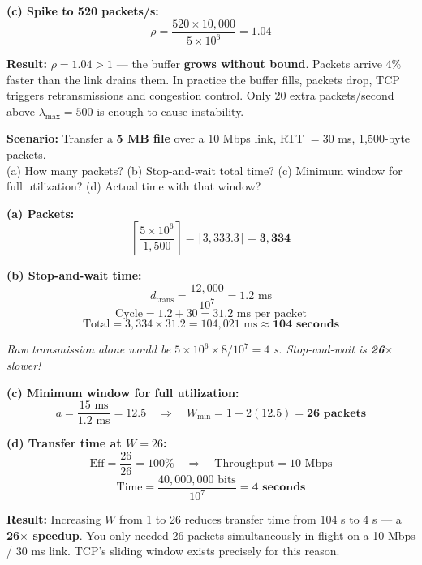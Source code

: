 \documentclass[11pt, letterpaper]{article}
\begin{document}
\textbf{(c) Spike to 520 packets/s:}
\[\rho = \frac{520 \times 10{,}000}{5 \times 10^6} = 1.04\]

\begin{tcolorbox}[colback=part4bg, colframe=sectionorange, arc=3pt, boxrule=1pt]
\textbf{Result:} $\rho = 1.04 > 1$ --- the buffer \textbf{grows without bound}. Packets
arrive 4\% faster than the link drains them. In practice the buffer fills, packets drop,
TCP triggers retransmissions and congestion control. Only 20 extra packets/second above
$\lambda_{\max} = 500$ is enough to cause instability.
\end{tcolorbox}

\vspace{8pt}

\begin{tcolorbox}[colback=part4bg, colframe=sectionorange,
  title={\bfseries Problem A6 --- File Transfer: Stop-and-Wait vs.\ Pipelining}, arc=3pt, boxrule=1pt]
\textbf{Scenario:} Transfer a \textbf{5 MB file} over a 10 Mbps link, RTT $= 30$ ms,
1{,}500-byte packets.\\
(a) How many packets?\quad
(b) Stop-and-wait total time?\quad
(c) Minimum window for full utilization?\quad
(d) Actual time with that window?
\end{tcolorbox}

\textbf{(a) Packets:}
\[\left\lceil \frac{5 \times 10^6}{1{,}500} \right\rceil = \lceil 3{,}333.3 \rceil = \mathbf{3{,}334}\]

\textbf{(b) Stop-and-wait time:}
\[d_{\text{trans}} = \frac{12{,}000}{10^7} = 1.2 \text{ ms}\]
\[\text{Cycle} = 1.2 + 30 = 31.2 \text{ ms per packet}\]
\[\text{Total} = 3{,}334 \times 31.2 = 104{,}021 \text{ ms} \approx \mathbf{104 \text{ seconds}}\]

\textit{Raw transmission alone would be $5\times10^6\times8 / 10^7 = 4$ s. Stop-and-wait
is \textbf{26}$\times$ slower!}

\textbf{(c) Minimum window for full utilization:}
\[a = \frac{15\text{ ms}}{1.2\text{ ms}} = 12.5 \quad\Longrightarrow\quad
  W_{\min} = 1 + 2(12.5) = \mathbf{26 \text{ packets}}\]

\textbf{(d) Transfer time at $W = 26$:}
\[\text{Eff} = \frac{26}{26} = 100\% \quad\Longrightarrow\quad \text{Throughput} = 10\text{ Mbps}\]
\[\text{Time} = \frac{40{,}000{,}000\text{ bits}}{10^7} = \mathbf{4 \text{ seconds}}\]

\begin{tcolorbox}[colback=part4bg, colframe=sectionorange, arc=3pt, boxrule=1pt]
\textbf{Result:} Increasing $W$ from 1 to 26 reduces transfer time from 104 s to 4 s ---
a \textbf{26$\times$ speedup}. You only needed 26 packets simultaneously in flight on a
10 Mbps / 30 ms link. TCP's sliding window exists precisely for this reason.
\end{tcolorbox}
\end{document}
